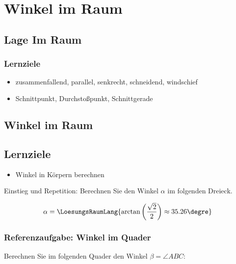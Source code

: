 \section{Winkel im Raum}
\sectuntertitel{}


\subsection{Lage Im Raum}

\subsubsection*{Lernziele}
\begin{itemize}
\item zusammenfallend, parallel, senkrecht, schneidend, windschief
\item Schnittpunkt, Durchstoßpunkt, Schnittgerade 
\end{itemize}

\newpage


\subsection{Winkel im Raum}


\subsection*{Lernziele}
\begin{itemize}
\item Winkel in Körpern berechnen
\end{itemize}


Einstieg und Repetition: Berechnen Sie den Winkel $\alpha$ im folgenden Dreieck.


$$\alpha= \LoesungsRaumLang{ \arctan\left(\frac{\sqrt2}2\right) \approx 35.26\degre  }$$

\newpage

\subsubsection{Referenzaufgabe: Winkel im Quader}

Berechnen Sie im folgenden Quader den Winkel $\beta = \angle ABC$:

